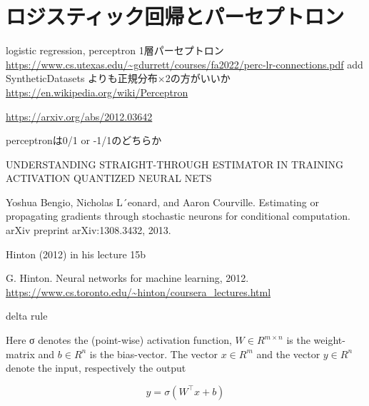 \section{ロジスティック回帰とパーセプトロン}
logistic regression, perceptron
1層パーセプトロン
\url{https://www.cs.utexas.edu/~gdurrett/courses/fa2022/perc-lr-connections.pdf}
add SyntheticDatasets
よりも正規分布×2の方がいいか
\url{https://en.wikipedia.org/wiki/Perceptron}

\url{https://arxiv.org/abs/2012.03642}


perceptronは0/1 or -1/1のどちらか

UNDERSTANDING STRAIGHT-THROUGH ESTIMATOR IN TRAINING ACTIVATION QUANTIZED NEURAL NETS

Yoshua Bengio, Nicholas L´eonard, and Aaron Courville. Estimating or propagating gradients through stochastic neurons for conditional computation. arXiv preprint arXiv:1308.3432, 2013.

Hinton (2012) in his lecture 15b

G. Hinton. Neural networks for machine learning, 2012.
\url{https://www.cs.toronto.edu/~hinton/coursera_lectures.html}

delta rule









Here σ denotes the (point-wise) activation function, $W \in R^{m\times n}$
is the weight-matrix and $b \in R^n$
is
the bias-vector. The vector $x \in R^m$ and the vector $y \in R^n$ denote the input, respectively the output


\begin{equation}
y=\sigma(W^\top x + b)
\end{equation}



